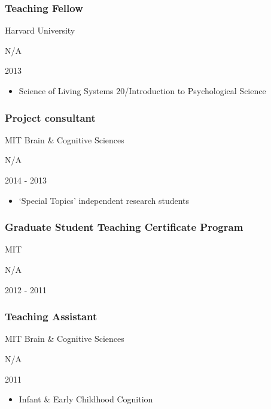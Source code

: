 \documentclass[
]{article}
\providecommand{\tightlist}{%
  \setlength{\itemsep}{0pt}\setlength{\parskip}{0pt}}
\begin{document}
\hypertarget{teaching-fellow}{%
\subsubsection{Teaching Fellow}\label{teaching-fellow}}

Harvard University

N/A

2013

\begin{itemize}
\tightlist
\item
  Science of Living Systems 20/Introduction to Psychological Science
\end{itemize}

\hypertarget{project-consultant}{%
\subsubsection{Project consultant}\label{project-consultant}}

MIT Brain \& Cognitive Sciences

N/A

2014 - 2013

\begin{itemize}
\tightlist
\item
  `Special Topics' independent research students
\end{itemize}

\hypertarget{graduate-student-teaching-certificate-program}{%
\subsubsection{Graduate Student Teaching Certificate
Program}\label{graduate-student-teaching-certificate-program}}

MIT

N/A

2012 - 2011

\hypertarget{teaching-assistant}{%
\subsubsection{Teaching Assistant}\label{teaching-assistant}}

MIT Brain \& Cognitive Sciences

N/A

2011

\begin{itemize}
\tightlist
\item
  Infant \& Early Childhood Cognition
\end{itemize}
\end{document}
